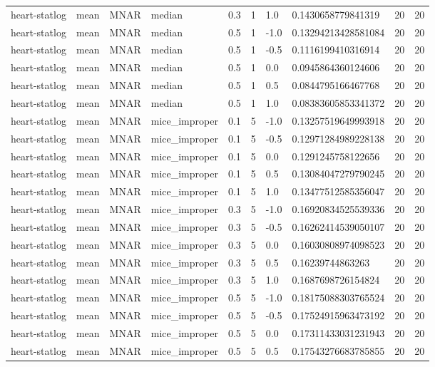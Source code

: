 \begin{tabular}{llllllllll}
heart-statlog & mean & MNAR & median & 0.3 & 1 & 1.0 & 0.1430658779841319 & 20 & 20 \\
heart-statlog & mean & MNAR & median & 0.5 & 1 & -1.0 & 0.13294213428581084 & 20 & 20 \\
heart-statlog & mean & MNAR & median & 0.5 & 1 & -0.5 & 0.1116199410316914 & 20 & 20 \\
heart-statlog & mean & MNAR & median & 0.5 & 1 & 0.0 & 0.0945864360124606 & 20 & 20 \\
heart-statlog & mean & MNAR & median & 0.5 & 1 & 0.5 & 0.0844795166467768 & 20 & 20 \\
heart-statlog & mean & MNAR & median & 0.5 & 1 & 1.0 & 0.08383605853341372 & 20 & 20 \\
heart-statlog & mean & MNAR & mice\_improper & 0.1 & 5 & -1.0 & 0.13257519649993918 & 20 & 20 \\
heart-statlog & mean & MNAR & mice\_improper & 0.1 & 5 & -0.5 & 0.12971284989228138 & 20 & 20 \\
heart-statlog & mean & MNAR & mice\_improper & 0.1 & 5 & 0.0 & 0.1291245758122656 & 20 & 20 \\
heart-statlog & mean & MNAR & mice\_improper & 0.1 & 5 & 0.5 & 0.13084047279790245 & 20 & 20 \\
heart-statlog & mean & MNAR & mice\_improper & 0.1 & 5 & 1.0 & 0.13477512585356047 & 20 & 20 \\
heart-statlog & mean & MNAR & mice\_improper & 0.3 & 5 & -1.0 & 0.16920834525539336 & 20 & 20 \\
heart-statlog & mean & MNAR & mice\_improper & 0.3 & 5 & -0.5 & 0.16262414539050107 & 20 & 20 \\
heart-statlog & mean & MNAR & mice\_improper & 0.3 & 5 & 0.0 & 0.16030808974098523 & 20 & 20 \\
heart-statlog & mean & MNAR & mice\_improper & 0.3 & 5 & 0.5 & 0.16239744863263 & 20 & 20 \\
heart-statlog & mean & MNAR & mice\_improper & 0.3 & 5 & 1.0 & 0.1687698726154824 & 20 & 20 \\
heart-statlog & mean & MNAR & mice\_improper & 0.5 & 5 & -1.0 & 0.18175088303765524 & 20 & 20 \\
heart-statlog & mean & MNAR & mice\_improper & 0.5 & 5 & -0.5 & 0.17524915963473192 & 20 & 20 \\
heart-statlog & mean & MNAR & mice\_improper & 0.5 & 5 & 0.0 & 0.17311433031231943 & 20 & 20 \\
heart-statlog & mean & MNAR & mice\_improper & 0.5 & 5 & 0.5 & 0.17543276683785855 & 20 & 20 \\

\end{tabular}
